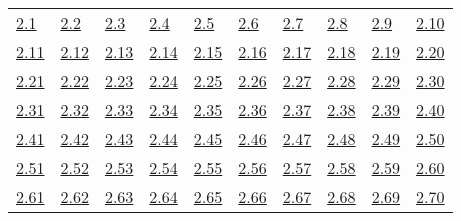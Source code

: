 \begin{tabular}{llllllllll}
\hyperref[練習問題 2.1]{2.1} &
\hyperref[練習問題 2.2]{2.2} &
\hyperref[練習問題 2.3]{2.3} &
\hyperref[練習問題 2.4]{2.4} &
\hyperref[練習問題 2.5]{2.5} &
\hyperref[練習問題 2.6]{2.6} &
\hyperref[練習問題 2.7]{2.7} &
\hyperref[練習問題 2.8]{2.8} &
\hyperref[練習問題 2.9]{2.9} &
\hyperref[練習問題 2.10]{2.10}
\\ 
\hyperref[練習問題 2.11]{2.11} &
\hyperref[練習問題 2.12]{2.12} &
\hyperref[練習問題 2.13]{2.13} &
\hyperref[練習問題 2.14]{2.14} &
\hyperref[練習問題 2.15]{2.15} &
\hyperref[練習問題 2.16]{2.16} &
\hyperref[練習問題 2.17]{2.17} &
\hyperref[練習問題 2.18]{2.18} &
\hyperref[練習問題 2.19]{2.19} &
\hyperref[練習問題 2.20]{2.20}
\\ 
\hyperref[練習問題 2.21]{2.21} &
\hyperref[練習問題 2.22]{2.22} &
\hyperref[練習問題 2.23]{2.23} &
\hyperref[練習問題 2.24]{2.24} &
\hyperref[練習問題 2.25]{2.25} &
\hyperref[練習問題 2.26]{2.26} &
\hyperref[練習問題 2.27]{2.27} &
\hyperref[練習問題 2.28]{2.28} &
\hyperref[練習問題 2.29]{2.29} &
\hyperref[練習問題 2.30]{2.30}
\\ 
\hyperref[練習問題 2.31]{2.31} &
\hyperref[練習問題 2.32]{2.32} &
\hyperref[練習問題 2.33]{2.33} &
\hyperref[練習問題 2.34]{2.34} &
\hyperref[練習問題 2.35]{2.35} &
\hyperref[練習問題 2.36]{2.36} &
\hyperref[練習問題 2.37]{2.37} &
\hyperref[練習問題 2.38]{2.38} &
\hyperref[練習問題 2.39]{2.39} &
\hyperref[練習問題 2.40]{2.40}
\\ 
\hyperref[練習問題 2.41]{2.41} &
\hyperref[練習問題 2.42]{2.42} &
\hyperref[練習問題 2.43]{2.43} &
\hyperref[練習問題 2.44]{2.44} &
\hyperref[練習問題 2.45]{2.45} &
\hyperref[練習問題 2.46]{2.46} &
\hyperref[練習問題 2.47]{2.47} &
\hyperref[練習問題 2.48]{2.48} &
\hyperref[練習問題 2.49]{2.49} &
\hyperref[練習問題 2.50]{2.50}
\\ 
\hyperref[練習問題 2.51]{2.51} &
\hyperref[練習問題 2.52]{2.52} &
\hyperref[練習問題 2.53]{2.53} &
\hyperref[練習問題 2.54]{2.54} &
\hyperref[練習問題 2.55]{2.55} &
\hyperref[練習問題 2.56]{2.56} &
\hyperref[練習問題 2.57]{2.57} &
\hyperref[練習問題 2.58]{2.58} &
\hyperref[練習問題 2.59]{2.59} &
\hyperref[練習問題 2.60]{2.60}
\\ 
\hyperref[練習問題 2.61]{2.61} &
\hyperref[練習問題 2.62]{2.62} &
\hyperref[練習問題 2.63]{2.63} &
\hyperref[練習問題 2.64]{2.64} &
\hyperref[練習問題 2.65]{2.65} &
\hyperref[練習問題 2.66]{2.66} &
\hyperref[練習問題 2.67]{2.67} &
\hyperref[練習問題 2.68]{2.68} &
\hyperref[練習問題 2.69]{2.69} &
\hyperref[練習問題 2.70]{2.70}

\end{tabular}
